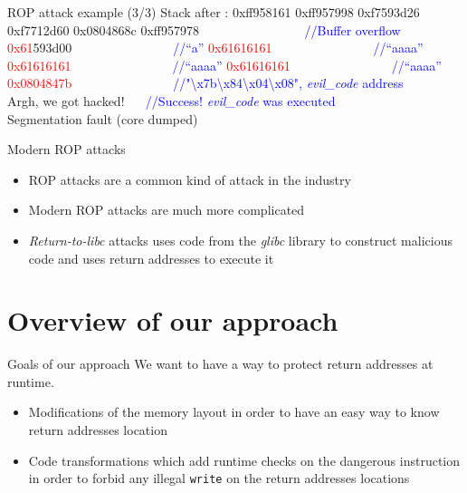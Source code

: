 \documentclass{beamer}
\begin{document}
\begin{frame}[c]{ROP attack example (3/3)}
Stack after : \hfill \break
0xff958161    \hfill \break
0xff957998    \hfill \break
0xf7593d26    \hfill \break
0xf7712d60    \hfill \break
0x0804868c    \hfill \break
0xff957978   			   ~~~~~~~~~~~~~~~~\textcolor{blue}{//Buffer overflow}\hfill \break
\textcolor{red}{0x61}593d00~~~~~~~~~~~~~~~~\textcolor{blue}{//``a''   } \hfill \break
\textcolor{red}{0x61616161}~~~~~~~~~~~~~~~~\textcolor{blue}{//``aaaa''} \hfill \break
\textcolor{red}{0x61616161}~~~~~~~~~~~~~~~~\textcolor{blue}{//``aaaa''} \hfill \break
\textcolor{red}{0x61616161}~~~~~~~~~~~~~~~~\textcolor{blue}{//``aaaa''} \hfill \break
\textcolor{red}{0x0804847b}~~~~~~~~~~~~~~~~\textcolor{blue}{//"\textbackslash{x7b}\textbackslash{x84}\textbackslash{x04}\textbackslash{x08}",  \textit{evil\_code} address }
\\
Argh, we got hacked! ~~\textcolor{blue}{ //Success! \textit{evil\_code} was executed}\\
Segmentation fault (core dumped)
\end{frame}

\begin{frame}[c]{Modern ROP attacks}
\begin{itemize}
	\item ROP attacks are a common kind of attack in the industry
	\item Modern ROP attacks are much more complicated 
	\item \textit{Return-to-libc} attacks uses code from the \textit{glibc} library to construct malicious code and uses return addresses to execute it
\end{itemize}
\end{frame}




\section{Overview of our approach}
\label{sec:Overview of our approach}

\begin{frame}[c]{Goals of our approach}
	We want to have a way to protect return addresses at runtime.
	\begin{itemize}
		\item Modifications of the memory layout in order to have an easy way to know return addresses location
		\item Code transformations which add runtime checks on the dangerous instruction in order to forbid any illegal \texttt{write} on the return addresses locations
	\end{itemize}
\end{frame}
\end{document}
